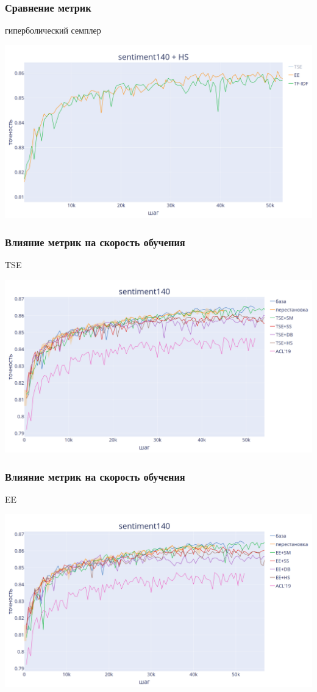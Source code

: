 \documentclass{beamer}
\begin{document}
\begin{frame}
	\frametitle{Сравнение метрик}
	гиперболический семплер
	\begin{center}
		\includegraphics[scale=0.18]{s140_hyperbole}
	\end{center}
\end{frame}

\begin{frame}
	\frametitle{Влияние метрик на скорость обучения}
	TSE
	\begin{center}
		\includegraphics[scale=0.18]{s140_tse_final}
	\end{center}
\end{frame}

\begin{frame}
	\frametitle{Влияние метрик на скорость обучения}
	EE
	\begin{center}
		\includegraphics[scale=0.18]{s140_ee_final}
	\end{center}
\end{frame}
\end{document}
